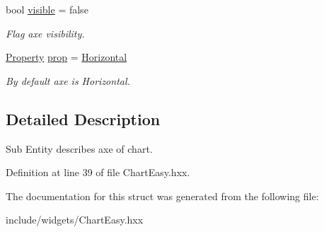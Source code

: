 \begin{DoxyCompactItemize}
bool \mbox{\hyperlink{structeven_1_1_chart_easy_1_1_axe_ab65bb6cfca8feea9283f9ceb2d57626b}{visible}} = false
\begin{DoxyCompactList}\small\item\em Flag axe visibility. \end{DoxyCompactList}\item 
\mbox{\label{structeven_1_1_chart_easy_1_1_axe_a5b0abfa10583784d102d3cabeb574bfe}} 
\mbox{\hyperlink{classeven_1_1_chart_easy_a3a647749c693d508d8af5a039f4f8848}{Property}} \mbox{\hyperlink{structeven_1_1_chart_easy_1_1_axe_a5b0abfa10583784d102d3cabeb574bfe}{prop}} = \mbox{\hyperlink{classeven_1_1_chart_easy_a3a647749c693d508d8af5a039f4f8848a6635c6b4db87a9c90e5bf12ed8ed37ce}{Horizontal}}
\begin{DoxyCompactList}\small\item\em By default axe is Horizontal. \end{DoxyCompactList}\end{DoxyCompactItemize}


\subsection{Detailed Description}
Sub Entity describes axe of chart. 

Definition at line 39 of file Chart\+Easy.\+hxx.



The documentation for this struct was generated from the following file\+:\begin{DoxyCompactItemize}
\item 
include/widgets/Chart\+Easy.\+hxx\end{DoxyCompactItemize}
